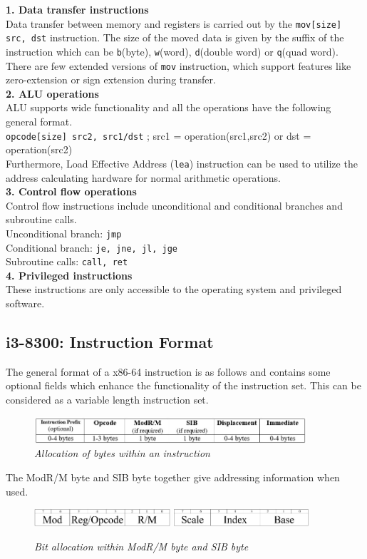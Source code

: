 \documentclass[a4paper,11pt]{article}
\begin{document}
\textbf{1. Data transfer instructions}\\
Data transfer between memory and registers is carried out by the {\tt mov[size] src, dst} instruction. The size of the moved data is given by the suffix of the instruction which can be {\tt b}(byte), {\tt w}(word), {\tt d}(double word) or {\tt q}(quad word). There are few extended versions of {\tt mov} instruction, which support features like zero-extension or sign extension during transfer.\\
\textbf{2. ALU operations}\\
ALU supports wide functionality and all the operations have the following general format.\\
{\tt opcode[size] src2, src1/dst} ; src1 = operation(src1,src2) or dst = operation(src2)\\
Furthermore, Load Effective Address ({\tt lea}) instruction can be used to utilize the address calculating hardware for normal arithmetic operations.\\
\textbf{3. Control flow operations}\\
Control flow instructions include unconditional and conditional branches and subroutine calls.\\
Unconditional branch: {\tt jmp}\\
Conditional branch: {\tt je, jne, jl, jge}\\
Subroutine calls: {\tt call, ret}\\
\textbf{4. Privileged instructions}\\
These instructions are only accessible to the operating system and privileged software.
\subsection{i3-8300: Instruction Format}
The general format of a x86-64 instruction is as follows and contains some optional fields which enhance the functionality of the instruction set. This can be considered as a variable length instruction set.
\begin{figure}[H]
\centering
\includegraphics[width=0.90\textwidth]{figures/InsForm.jpg}
\caption{{\small \textit{Allocation of bytes within an instruction}}\cite{i3dev}}
\end{figure}
The ModR/M byte and SIB byte together give addressing information when used.
\begin{figure}[H]
\centering
\includegraphics[width=0.45\textwidth]{figures/ModRM.jpg}
\includegraphics[width=0.45\textwidth]{figures/SIB.jpg}
\caption{{\small \textit{Bit allocation within ModR/M byte and SIB byte}}\cite{i3dev}}
\end{figure}
\end{document}
